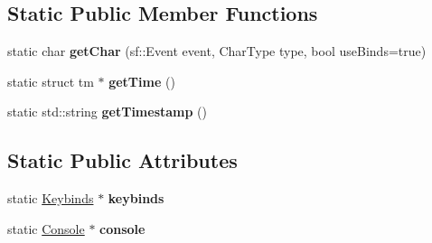 \subsection*{Static Public Member Functions}
\begin{DoxyCompactItemize}
\item 
static char {\bfseries get\+Char} (sf\+::\+Event event, Char\+Type type, bool use\+Binds=true)\hypertarget{classEngine_a8de2605cee789558ae211e4fac46b5e1}{}\label{classEngine_a8de2605cee789558ae211e4fac46b5e1}

\item 
static struct tm $\ast$ {\bfseries get\+Time} ()\hypertarget{classEngine_afb9db1b96d86458ae665b2614fd0bd9b}{}\label{classEngine_afb9db1b96d86458ae665b2614fd0bd9b}

\item 
static std\+::string {\bfseries get\+Timestamp} ()\hypertarget{classEngine_ad89df061e48c5dfb14632b67fc77fe0c}{}\label{classEngine_ad89df061e48c5dfb14632b67fc77fe0c}

\end{DoxyCompactItemize}
\subsection*{Static Public Attributes}
\begin{DoxyCompactItemize}
\item 
static \hyperlink{classKeybinds}{Keybinds} $\ast$ {\bfseries keybinds}\hypertarget{classEngine_a8a8da9ed9351a24a655f86b5bec194d3}{}\label{classEngine_a8a8da9ed9351a24a655f86b5bec194d3}

\item 
static \hyperlink{classConsole}{Console} $\ast$ {\bfseries console}\hypertarget{classEngine_a53c45cdb8fb792675360bcd126a11c55}{}\label{classEngine_a53c45cdb8fb792675360bcd126a11c55}

\end{DoxyCompactItemize}
